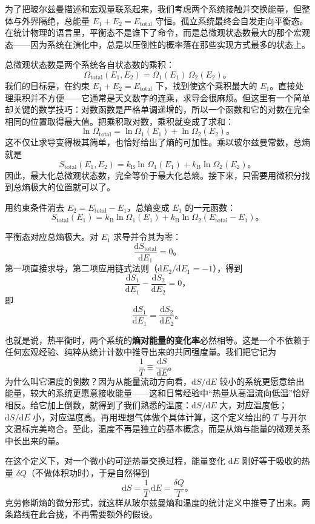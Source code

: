 \documentclass[UTF8]{ctexbook}
\begin{document}
为了把玻尔兹曼描述和宏观量联系起来，我们考虑两个系统接触并交换能量，但整体与外界隔绝，总能量 $E_1+E_2 = E_{\text{total}}$ 守恒。孤立系统最终会自发走向平衡态。在统计物理的语言里，平衡态不是谁下了命令，而是总微观状态数最大的那个宏观态——因为系统在演化中，总是以压倒性的概率落在那些实现方式最多的状态上。

总微观状态数是两个系统各自状态数的乘积：
\[
\Omega_{\text{total}}(E_1,E_2) = \Omega_1(E_1)\,\Omega_2(E_2)。
\]
我们的目标是，在约束 $E_1+E_2 = E_{\text{total}}$ 下，找到使这个乘积最大的 $E_1$。直接处理乘积并不方便——它通常是天文数字的连乘，求导会很麻烦。但这里有一个简单却关键的数学技巧：对数函数是严格单调递增的，所以一个函数和它的对数在完全相同的位置取得最大值。把乘积取对数，乘积就变成了求和：
\[
\ln\Omega_{\text{total}} = \ln\Omega_1(E_1) + \ln\Omega_2(E_2)。
\]
这不仅让求导变得极其简单，也恰好给出了熵的可加性。乘以玻尔兹曼常数，总熵就是
\[
S_{\text{total}}(E_1,E_2) = k_{\text{B}}\ln\Omega_1(E_1) + k_{\text{B}}\ln\Omega_2(E_2)。
\]
因此，最大化总微观状态数，完全等价于最大化总熵。接下来，只需要用微积分找到总熵极大的位置就可以了。

用约束条件消去 $E_2 = E_{\text{total}}-E_1$，总熵变成 $E_1$ 的一元函数：
\[
S_{\text{total}}(E_1) = k_{\text{B}}\ln\Omega_1(E_1) + k_{\text{B}}\ln\Omega_2(E_{\text{total}}-E_1)。
\]

平衡态对应总熵极大。对 $E_1$ 求导并令其为零：
\[
\frac{\mathrm dS_{\text{total}}}{\mathrm dE_1} = 0。
\]
第一项直接求导，第二项应用链式法则（$\mathrm dE_2/\mathrm dE_1 = -1$），得到
\[
\frac{\mathrm dS_1}{\mathrm dE_1} - \frac{\mathrm dS_2}{\mathrm dE_2} = 0，
\]
即
\[
\frac{\mathrm dS_1}{\mathrm dE_1} = \frac{\mathrm dS_2}{\mathrm dE_2}。
\]

也就是说，热平衡时，两个系统的\textbf{熵对能量的变化率}必然相等。这是一个不依赖于任何宏观经验、纯粹从统计计数中推导出来的共同强度量。我们把它记为
\[
\frac{1}{T} \equiv \frac{\mathrm dS}{\mathrm dE}。
\]
为什么叫它温度的倒数？因为从能量流动方向看，$\mathrm dS/\mathrm dE$ 较小的系统更愿意给出能量，较大的系统更愿意接收能量——这和日常经验中“热量从高温流向低温”恰好相反。给它加上倒数，就得到了我们熟悉的温度：$\mathrm dS/\mathrm dE$ 大，对应温度低；$\mathrm dS/\mathrm dE$ 小，对应温度高。再用理想气体做个具体计算，这个定义给出的 $T$ 与开尔文温标完美吻合。至此，温度不再是独立的基本概念，而是从熵与能量的微观关系中长出来的量。

在这个定义下，对一个微小的可逆热量交换过程，能量变化 $\mathrm dE$ 刚好等于吸收的热量 $\delta Q$（不做体积功时），于是自然得到
\[
\mathrm dS = \frac{1}{T}\,\mathrm dE = \frac{\delta Q}{T}。
\]
克劳修斯熵的微分形式，就这样从玻尔兹曼熵和温度的统计定义中推导了出来。两条路线在此合拢，不再需要额外的假设。
\end{document}
